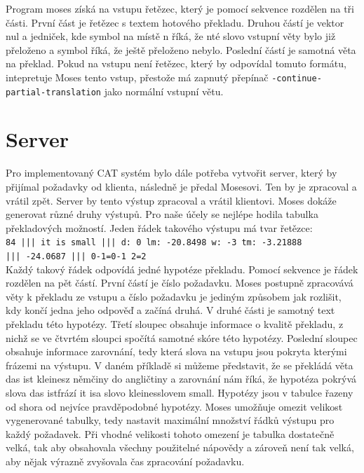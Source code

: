 \documentclass[12pt,a4paper]{report}
\begin{document}
Program moses získá na vstupu řetězec, který je pomocí sekvence \clqq {\tt |||}\crqq  rozdělen na tři části. První část je řetězec s textem hotového překladu. Druhou částí je vektor nul a jedniček, kde symbol \crqq  na místě n říká, že nté slovo vstupní věty bylo již přeloženo a symbol \crqq  říká, že ještě přeloženo nebylo. Poslední částí je samotná věta na překlad. Pokud na vstupu není řetězec, který by odpovídal tomuto formátu, intepretuje Moses tento vstup, přestože má zapnutý přepínač {\tt -continue-partial-translation} jako normální vstupní větu.

\section{Server}

Pro implementovaný CAT systém bylo dále potřeba vytvořit server, který by přijímal požadavky od klienta, následně je předal Mosesovi. Ten by je zpracoval a vrátil zpět. Server by tento výstup zpracoval a vrátil klientovi. Moses dokáže generovat různé druhy výstupů. Pro naše účely se nejlépe hodila tabulka překladových možností. Jeden řádek takového výstupu má tvar řetězce: \\

{\tt 84 ||| it is small  ||| d: 0 lm: -20.8498 w: -3 tm: -3.21888 \\ ||| -24.0687 ||| 0-1=0-1 2=2 } \\

Každý takový řádek odpovídá jedné hypotéze překladu. Pomocí sekvence \clqq {\tt |||}\crqq  je řádek rozdělen na pět částí. První částí je číslo požadavku. Moses postupně zpracovává věty k překladu ze vstupu a číslo požadavku je jediným způsobem jak rozlišit, kdy končí jedna jeho odpověď a začíná druhá. V druhé části je samotný text překladu této hypotézy. Třetí sloupec obsahuje informace o kvalitě překladu, z nichž se ve čtvrtém sloupci spočítá samotné skóre této hypotézy. Poslední sloupec obsahuje informace zarovnání, tedy která slova na vstupu jsou pokryta kterými frázemi na výstupu. V daném příkladě si můžeme představit, že se překládá věta \clqq das ist kleines\crqq  z němčiny do angličtiny a zarovnání nám říká, že hypotéza pokrývá slova \clqq das ist\crqq  frází \clqq it is\crqq  a slovo \clqq kleines\crqq  slovem \clqq small\crqq . Hypotézy jsou v tabulce řazeny od shora od nejvíce pravděpodobné hypotézy. Moses umožňuje omezit velikost vygenerované tabulky, tedy nastavit maximální množství řádků výstupu pro každý požadavek. Při vhodné velikosti tohoto omezení je tabulka dostatečně velká, tak aby obsahovala všechny použitelné nápovědy a zároveň není tak velká, aby nějak výrazně zvyšovala čas zpracování požadavku.
\end{document}
